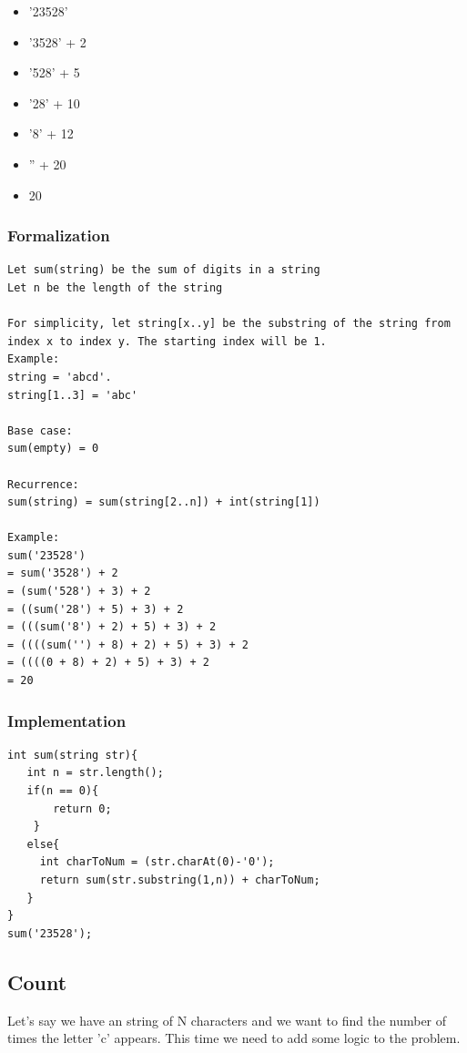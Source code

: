 \documentclass[11pt,oneside]{book}
\begin{document}
\begin{itemize}
\item '23528'
\item '3528' + 2
\item '528' + 5
\item '28' + 10
\item '8' + 12
\item '' + 20
\item 20
\end{itemize}

\subsubsection{Formalization}

\begin{lstlisting}
Let sum(string) be the sum of digits in a string
Let n be the length of the string

For simplicity, let string[x..y] be the substring of the string from index x to index y. The starting index will be 1.
Example: 
string = 'abcd'.
string[1..3] = 'abc'

Base case:
sum(empty) = 0

Recurrence:
sum(string) = sum(string[2..n]) + int(string[1])

Example:
sum('23528')
= sum('3528') + 2
= (sum('528') + 3) + 2
= ((sum('28') + 5) + 3) + 2
= (((sum('8') + 2) + 5) + 3) + 2
= ((((sum('') + 8) + 2) + 5) + 3) + 2
= ((((0 + 8) + 2) + 5) + 3) + 2
= 20
\end{lstlisting}

\subsubsection{Implementation}

\begin{lstlisting}
int sum(string str){
   int n = str.length();
   if(n == 0){
       return 0;
    }
   else{
     int charToNum = (str.charAt(0)-'0');
     return sum(str.substring(1,n)) + charToNum;
   }
}
sum('23528');
\end{lstlisting}

\subsection{Count}

Let's say we have an string of N characters and we want to find the number of times the letter 'c' appears. This time we need to add some logic to the problem.
\end{document}
